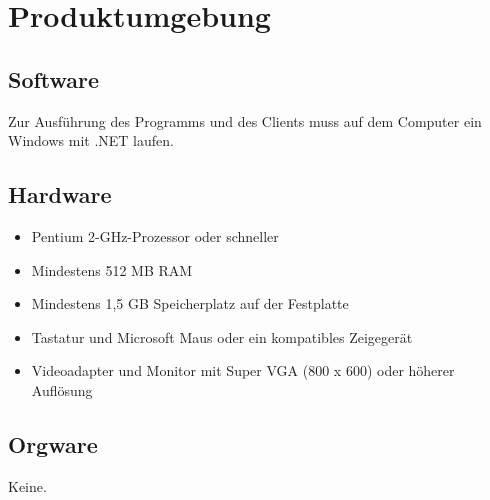 
\section{Produktumgebung}


\subsection{Software}

Zur Ausführung des Programms und des Clients muss auf dem Computer ein Windows mit .NET laufen.

\subsection{Hardware}

\begin{itemize}
	\item Pentium 2-GHz-Prozessor oder schneller
	\item Mindestens 512 MB RAM
	\item Mindestens 1,5 GB Speicherplatz auf der Festplatte
	\item Tastatur und Microsoft Maus oder ein kompatibles Zeigegerät
	\item Videoadapter und Monitor mit Super VGA (800 x 600) oder höherer Auflösung
\end{itemize}

\subsection{Orgware}

Keine.